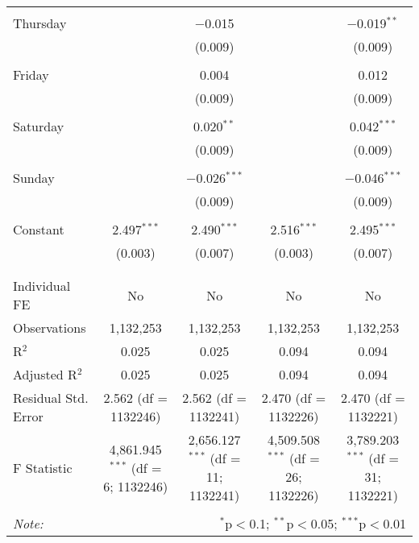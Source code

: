 \documentclass[
]{article}
\begin{document}
\begin{table}[!htbp]
{\begin{tabular}{@{\extracolsep{5pt}}lcccc}
  & & & & \\ 
 Thursday &  & $-$0.015 &  & $-$0.019$^{**}$ \\ 
  &  & (0.009) &  & (0.009) \\ 
  & & & & \\ 
 Friday &  & 0.004 &  & 0.012 \\ 
  &  & (0.009) &  & (0.009) \\ 
  & & & & \\ 
 Saturday &  & 0.020$^{**}$ &  & 0.042$^{***}$ \\ 
  &  & (0.009) &  & (0.009) \\ 
  & & & & \\ 
 Sunday &  & $-$0.026$^{***}$ &  & $-$0.046$^{***}$ \\ 
  &  & (0.009) &  & (0.009) \\ 
  & & & & \\ 
 Constant & 2.497$^{***}$ & 2.490$^{***}$ & 2.516$^{***}$ & 2.495$^{***}$ \\ 
  & (0.003) & (0.007) & (0.003) & (0.007) \\ 
  & & & & \\ 
\hline \\[-1.8ex] 
Individual FE & No & No & No & No \\ 
Observations & 1,132,253 & 1,132,253 & 1,132,253 & 1,132,253 \\ 
R$^{2}$ & 0.025 & 0.025 & 0.094 & 0.094 \\ 
Adjusted R$^{2}$ & 0.025 & 0.025 & 0.094 & 0.094 \\ 
Residual Std. Error & 2.562 (df = 1132246) & 2.562 (df = 1132241) & 2.470 (df = 1132226) & 2.470 (df = 1132221) \\ 
F Statistic & 4,861.945$^{***}$ (df = 6; 1132246) & 2,656.127$^{***}$ (df = 11; 1132241) & 4,509.508$^{***}$ (df = 26; 1132226) & 3,789.203$^{***}$ (df = 31; 1132221) \\ 
\hline 
\hline \\[-1.8ex] 
\textit{Note:}  & \multicolumn{4}{r}{$^{*}$p$<$0.1; $^{**}$p$<$0.05; $^{***}$p$<$0.01} \\ 
\end{tabular}
} 
\end{table} 
\newpage
\end{document}

